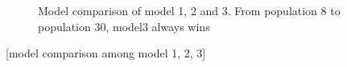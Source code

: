 \documentclass[12pt,a4paper]{report}
\begin{document}
\begin{figure}
    \begin{center}
    \end{center}

    \caption[Estimated posterior distribution of parameters in model 3]%
    {Estimated posterior distribution of parameters in model 3. Shaded range indicates 25\%--75\% quantile of the population}
    \label{fig:para1}

    \begin{center}
    \end{center}

    \caption[Model comparison of model 1, 2 and 3]%
    {Model comparison of model 1, 2 and 3. From population 8 to population 30, model3 always wins}
    \label{fig:cmp1}

\end{figure}

[model comparison among model 1, 2, 3]
\end{document}
